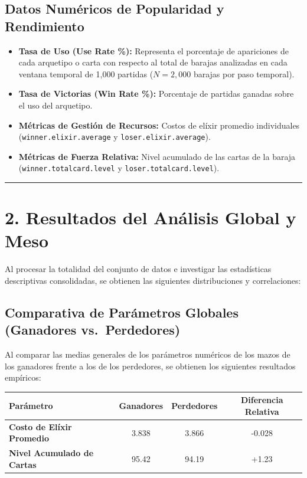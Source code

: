 \documentclass[
  spanish,
  12pt,
]{report}
\newcounter{none} %
\providecommand{\tightlist}{%
  \setlength{\itemsep}{0pt}\setlength{\parskip}{0pt}}
\begin{document}
\subsection{Datos Numéricos de Popularidad y
Rendimiento}\label{datos-numuxe9ricos-de-popularidad-y-rendimiento}

\begin{itemize}
\tightlist
\item
  \textbf{Tasa de Uso (Use Rate \%):} Representa el porcentaje de
  apariciones de cada arquetipo o carta con respecto al total de barajas
  analizadas en cada ventana temporal de 1,000 partidas (\(N = 2,000\)
  barajas por paso temporal).
\item
  \textbf{Tasa de Victorias (Win Rate \%):} Porcentaje de partidas
  ganadas sobre el uso del arquetipo.
\item
  \textbf{Métricas de Gestión de Recursos:} Costos de elíxir promedio
  individuales (\texttt{winner.elixir.average} y
  \texttt{loser.elixir.average}).
\item
  \textbf{Métricas de Fuerza Relativa:} Nivel acumulado de las cartas de
  la baraja (\texttt{winner.totalcard.level} y
  \texttt{loser.totalcard.level}).
\end{itemize}

\begin{center}\rule{0.5\linewidth}{0.5pt}\end{center}

\section{2. Resultados del Análisis Global y
Meso}\label{resultados-del-anuxe1lisis-global-y-meso}

Al procesar la totalidad del conjunto de datos e investigar las
estadísticas descriptivas consolidadas, se obtienen las siguientes
distribuciones y correlaciones:

\subsection{Comparativa de Parámetros Globales (Ganadores
vs.~Perdedores)}\label{comparativa-de-paruxe1metros-globales-ganadores-vs.-perdedores}

Al comparar las medias generales de los parámetros numéricos de los
mazos de los ganadores frente a los de los perdedores, se obtienen los
siguientes resultados empíricos:

{\def\LTcaptype{none} %
\begin{longtable}[]{@{}lccc@{}}
\toprule\noalign{}
Parámetro & Ganadores & Perdedores & Diferencia Relativa \\
\midrule\noalign{}
\endhead
\bottomrule\noalign{}
\endlastfoot
\textbf{Costo de Elíxir Promedio} & 3.838 & 3.866 & -0.028 \\
\textbf{Nivel Acumulado de Cartas} & 95.42 & 94.19 & +1.23 \\
\end{longtable}
}
\end{document}
